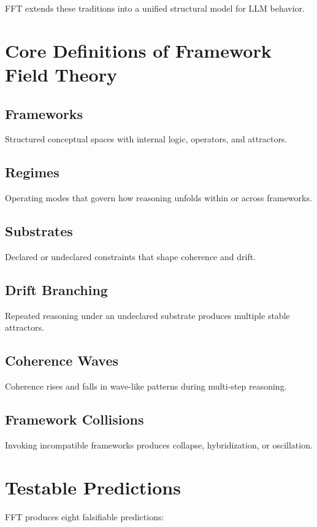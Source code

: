 \documentclass[11pt]{article}
\begin{document}
FFT extends these traditions into a unified structural model for LLM behavior.

\section{Core Definitions of Framework Field Theory}

\subsection{Frameworks}
Structured conceptual spaces with internal logic, operators, and attractors.

\subsection{Regimes}
Operating modes that govern how reasoning unfolds within or across frameworks.

\subsection{Substrates}
Declared or undeclared constraints that shape coherence and drift.

\subsection{Drift Branching}
Repeated reasoning under an undeclared substrate produces multiple stable attractors.

\subsection{Coherence Waves}
Coherence rises and falls in wave-like patterns during multi-step reasoning.

\subsection{Framework Collisions}
Invoking incompatible frameworks produces collapse, hybridization, or oscillation.

\section{Testable Predictions}

FFT produces eight falsifiable predictions:
\end{document}
